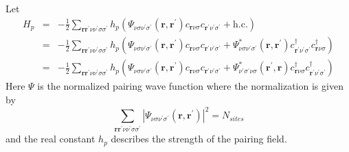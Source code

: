 Let
\begin{eqnarray}
H_{p} & = & - \frac{1}{2} 
\sum_{\mathbf{r}\mathbf{r}^{\prime}\nu\nu^{\prime}\sigma\sigma^{\prime}} 
h_p \left( \Psi_{\nu\sigma\nu^{\prime}\sigma^{\prime}}(\mathbf{r},\mathbf{r}^{\prime})
c_{\mathbf{r}\nu\sigma}
c_{\mathbf{r}^{\prime}\nu^{\prime}\sigma^{\prime}} + \mathrm{h.c.}\right) \\
 &  = & - \frac{1}{2} \sum_{\mathbf{r}\mathbf{r}^{\prime}\nu\nu^{\prime}\sigma\sigma^{\prime}} 
h_p \left(\Psi_{\nu\sigma\nu^{\prime}\sigma^{\prime}}(\mathbf{r},\mathbf{r}^{\prime})  
c_{\mathbf{r}\nu\sigma}
c_{\mathbf{r}^{\prime}\nu^{\prime}\sigma^{\prime}} + 
\Psi_{\nu\sigma\nu^{\prime}\sigma^{\prime}}^*(\mathbf{r},\mathbf{r}^{\prime}) 
c^{\dagger}_{\mathbf{r}^{\prime}\nu^{\prime}\sigma^{\prime}}
 c^{\dagger}_{\mathbf{r}\nu\sigma}\right) \\
& = &  - \frac{1}{2} 
\sum_{\mathbf{r}\mathbf{r}^{\prime}\nu\nu^{\prime}\sigma\sigma^{\prime}} 
h_p \left(\Psi_{\nu\sigma\nu^{\prime}\sigma^{\prime}}(\mathbf{r},\mathbf{r}^{\prime})  
c_{\mathbf{r}\nu\sigma}
c_{\mathbf{r}^{\prime}\nu^{\prime}\sigma^{\prime}} + 
\Psi_{\nu^{\prime}\sigma^{\prime}\nu\sigma}^*(\mathbf{r}^{\prime},\mathbf{r}) 
 c^{\dagger}_{\mathbf{r}\nu\sigma}c^{\dagger}_{\mathbf{r}^{\prime}\nu^{\prime}\sigma^{\prime}}
  \right)
\end{eqnarray}
Here $\Psi$ is the normalized pairing wave function
where the normalization is given by
\begin{equation}
\sum_{\mathbf{r}\mathbf{r}^{\prime}\nu\nu^{\prime}\sigma\sigma^{\prime}} | 
\Psi_{\nu\sigma\nu^{\prime}\sigma^{\prime}}(\mathbf{r},\mathbf{r}^{\prime}) |^2 = N_{sites}
\end{equation}
and the real constant $h_p$ describes the strength of the
pairing field.

